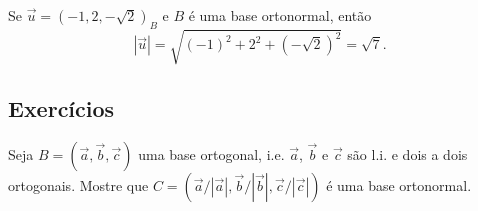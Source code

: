 \begin{ex}
  Se $\vec{u} = (-1,2,-\sqrt{2})_B$ e $B$ é uma base ortonormal, então
  \begin{equation}
    |\vec{u}| = \sqrt{(-1)^2 + 2^2 + (-\sqrt{2})^2} = \sqrt{7}.
  \end{equation}
\end{ex}

\subsection*{Exercícios}

\begin{exer}
  Seja $B = (\vec{a}, \vec{b}, \vec{c})$ uma base ortogonal, i.e. $\vec{a}$, $\vec{b}$ e $\vec{c}$ são l.i. e dois a dois ortogonais. Mostre que $C = (\vec{a}/|\vec{a}|,\vec{b}/|\vec{b}|,\vec{c}/|\vec{c}|)$ é uma base ortonormal.
\end{exer}

\emconstrucao